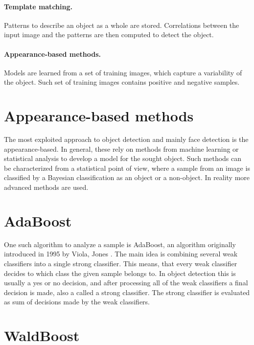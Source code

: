 \paragraph{Template matching.} Patterns to describe an object as a whole are stored. Correlations between the input image and the patterns are then computed to detect the object.

\paragraph{Appearance-based methods.} Models are learned from a set of training images, which capture a variability of the object. Such set of training images contains positive and negative samples.

\section{Appearance-based methods} \label{sec:appeareance-based}

The most exploited approach to object detection and mainly face detection is the appearance-based. In general, these rely on methods from machine learning or statistical analysis to develop a model for the sought object. Such methods can be characterized from a statistical point of view, where a sample from an image is classified by a Bayesian classification as an object or a non-object. In reality more advanced methods are used.

\section{AdaBoost}\label{sec:adaboost}

One such algorithm to analyze a sample is AdaBoost, an algorithm originally introduced in 1995 by Viola, Jones \cite{Viola01rapidobject}. The main idea is combining several weak classifiers into a single strong classifier. This means, that every weak classifier decides to which class the given sample belongs to. In object detection this is usually a yes or no decision, and after processing all of the weak classifiers a final decision is made, also a called a strong classifier. The strong classifier is evaluated as sum of decisions made by the weak classifiers.

\section{WaldBoost}\label{sec:waldboost}

